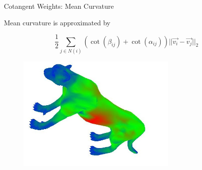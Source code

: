 \documentclass{beamer}
\begin{document}
\begin{frame}{Cotangent Weights: Mean Curvature}


Mean curvature is approximated by

\[ \frac{1}{2} \sum_{j \in N(i)}  (\cot(\beta_{ij}) + \cot(\alpha_{ij}))||\vec{v_i} - \vec{v_j}||_2 \]

\begin{figure}[t]
    \includegraphics[width=0.7\textwidth]{curv2_1.jpg}
\end{figure}

\end{frame}
\end{document}
